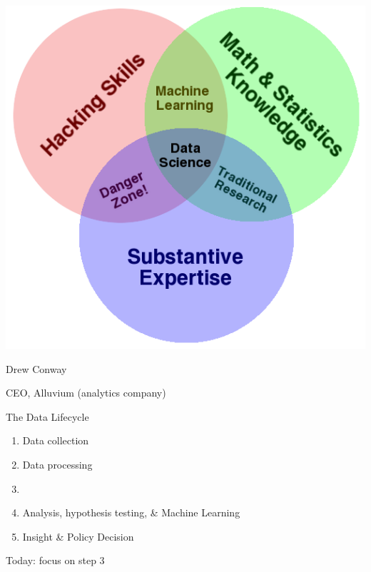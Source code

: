 \documentclass{beamer}
\begin{document}
\begin{frame}
    \centering
    \includegraphics[height=0.8\textheight]{fig/venn}

    Drew Conway

    CEO, Alluvium (analytics company)
\end{frame}


\begin{frame}{The Data Lifecycle}
    \begin{enumerate}
        \item Data collection
        \item Data processing
        \item {}
        \item Analysis, hypothesis testing, \& Machine Learning
        \item Insight \& Policy Decision
    \end{enumerate}

    Today: focus on step 3
\end{frame}
\end{document}
